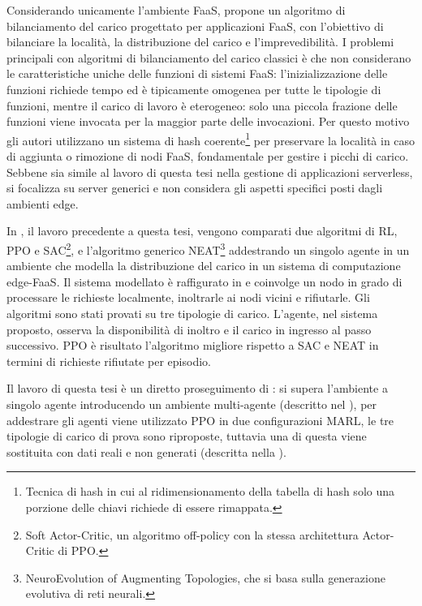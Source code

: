 Considerando unicamente l'ambiente FaaS, \cite{Fuerst2022} propone un algoritmo di bilanciamento del carico progettato per applicazioni FaaS, con l'obiettivo di bilanciare la località, la distribuzione del carico e l'imprevedibilità. I problemi principali con algoritmi di bilanciamento del carico classici è che non considerano le caratteristiche uniche delle funzioni di sistemi FaaS: l'inizializzazione delle funzioni richiede tempo ed è tipicamente omogenea per tutte le tipologie di funzioni, mentre il carico di lavoro è eterogeneo: solo una piccola frazione delle funzioni viene invocata per la maggior parte delle invocazioni. Per questo motivo gli autori utilizzano un sistema di hash coerente\footnote{Tecnica di hash in cui al ridimensionamento della tabella di hash solo una porzione delle chiavi richiede di essere rimappata.} per preservare la località in caso di aggiunta o rimozione di nodi FaaS, fondamentale per gestire i picchi di carico. Sebbene sia simile al lavoro di questa tesi nella gestione di applicazioni serverless, \cite{Fuerst2022} si focalizza su server generici e non considera gli aspetti specifici posti dagli ambienti edge.

In \cite{Petriglia2024}, il lavoro precedente a questa tesi, vengono comparati due algoritmi di RL, PPO e SAC\footnote{Soft Actor-Critic, un algoritmo off-policy con la stessa architettura Actor-Critic di PPO.}, e l'algoritmo generico NEAT\footnote{NeuroEvolution of Augmenting Topologies, che si basa sulla generazione evolutiva di reti neurali.} addestrando un singolo agente in un ambiente che modella la distribuzione del carico in un sistema di computazione edge-FaaS. Il sistema modellato è raffigurato in  e coinvolge un nodo in grado di processare le richieste localmente, inoltrarle ai nodi vicini e rifiutarle. Gli algoritmi sono stati provati su tre tipologie di carico. L'agente, nel sistema proposto, osserva la disponibilità di inoltro e il carico in ingresso al passo successivo. PPO è risultato l'algoritmo migliore rispetto a SAC e NEAT in termini di richieste rifiutate per episodio.

Il lavoro di questa tesi è un diretto proseguimento di \cite{Petriglia2024}: si supera l'ambiente a singolo agente introducendo un ambiente multi-agente (descritto nel ), per addestrare gli agenti viene utilizzato PPO in due configurazioni MARL, le tre tipologie di carico di prova sono riproposte, tuttavia una di questa viene sostituita con dati reali e non generati (descritta nella ).

